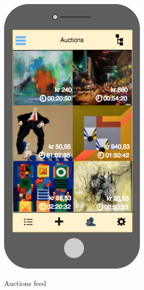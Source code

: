 \begin{figure}[H]
\centering
  \begin{minipage}[b]{0.31\linewidth}
    \caption{Auctions feed}
    \includegraphics[width=\linewidth]{Appendix/HorizontalPrototype/1.png}
    \label{AuctionsFeed}
  \end{minipage}

\end{figure}
